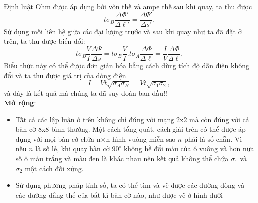 \begin{loigiai}
\begin{center}
\end{center}
Định luật Ohm được áp dụng bởi vôn thế và ampe thế sau khi quay, ta thu được 
$$t\sigma_B\dfrac{\Delta\Phi'}{\Delta\ell'}=\dfrac{\Delta\Psi'}{\Delta s'}.$$
Sử dụng mối liên hệ giữa các đại lượng trước và sau khi quay như ta đã đặt ở trên, ta thu được biến đổi:
\[t{\sigma _B}\frac{V}{I}\frac{\Delta \Psi}{\Delta s} = t{\sigma _B}\frac{V}{I}.t{\sigma _A}\frac{\Delta \Phi  }{\Delta  \ell} = \frac{I}{V}\frac{\Delta \Phi}{\Delta \ell}.\]
Biểu thức này có thể được đơn giản hóa bằng cách dùng tích độ dẫn điện không đổi và ta thu được giá trị của dòng điện 
\[I = Vt\sqrt {{\sigma _A}{\sigma _B}}  = Vt\sqrt {{\sigma _1}{\sigma _2}}, \]
và đây là kết quả mà chúng ta đã suy đoán ban đầu!!
\\ \textbf{Mở rộng}:
 \begin{itemize}
     \item Tất cả các lập luận ở trên không chỉ đúng với mạng 2x2 mà còn đúng với cả bàn cờ 8x8 bình thường. Một cách tổng quát, cách giải trên có thể được áp dụng với mọi bàn cờ chứa n$\times$n hình vuông miễn sao $n$ phải là số chẵn. Vì nếu $n$ là số lẻ, khi quay bàn cờ $90^\circ$ không hề đổi màu của ô vuông và hơn nữa số ô màu trắng và màu đen là khác nhau nên kết quả không thể chứa $\sigma_1$ và $\sigma_2$ một cách đối xứng.
     \item Sử dụng phương pháp tính số, ta có thể tìm và vẽ được các đường dòng và các đường đẳng thế của bất kì bàn cờ nào, như được vẽ ở hình dưới 


\end{itemize}
\end{loigiai}
